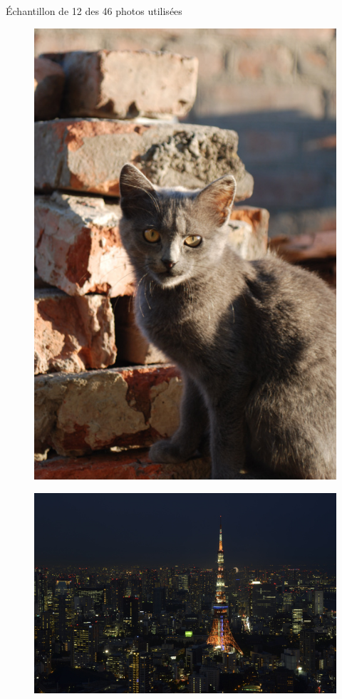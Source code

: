 \documentclass[xcolor=dvipsnames]{beamer}
\begin{document}
\begin{frame}{Échantillon de 12 des 46 photos utilisées} 

    \hfill
    \begin{minipage}{.23\textwidth}
        \centering
        \begin{figure}
            \includegraphics[width=.75\linewidth]{photos_utilises/1.jpg}
        \end{figure}
        \begin{figure}
            \includegraphics[width=1\linewidth]{photos_utilises/2.jpg}

\end{figure}
\end{minipage}
\end{frame}
\end{document}
